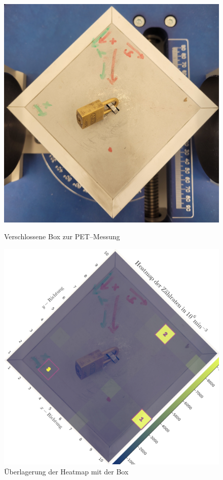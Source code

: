 \documentclass[12pt,a4paper]{scrartcl}
\numberwithin{equation}{section} %
\begin{document}
\begin{figure}[h!]
	\centering
	\begin{minipage}{0.43\textwidth}
		\includegraphics[width=\textwidth]{../media/B3.4/Box_von_oben.jpg}
		\caption{Verschlossene Box zur PET--Messung}
		\label{abb:PET box}
	\end{minipage}
	\begin{minipage}{0.45\textwidth}
		\includegraphics[width=\textwidth]{../media/B3.4/heatmap_with_box.jpg}
		\caption{Überlagerung der Heatmap mit der Box}
		\label{abb:heatmap & Box}
	\end{minipage}
\end{figure}
\end{document}
